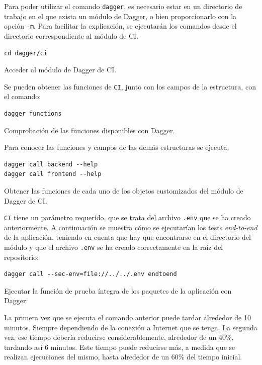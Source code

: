 \begin{enumerate}
    Para poder utilizar el comando \texttt{dagger}, es necesario estar en un directorio de trabajo en el que exista un módulo de Dagger, o bien proporcionarlo con la opción \texttt{-m}. Para facilitar la explicación, se ejecutarán los comandos desde el directorio correspondiente al módulo de CI.

\begin{listing}[!ht]
  \begin{verbatim}
cd dagger/ci
\end{verbatim}
\caption{Acceder al módulo de Dagger de CI.}
\end{listing}

Se pueden obtener las funciones de \texttt{CI}, junto con los campos de la estructura, con el comando:

\begin{listing}[!ht]
  \begin{verbatim}
dagger functions
\end{verbatim}
\caption{Comprobación de las funciones disponibles con Dagger.}
\end{listing}

    Para conocer las funciones y campos de las demás estructuras se ejecuta:

\begin{listing}[!ht]
  \begin{verbatim}
dagger call backend --help
dagger call frontend --help
\end{verbatim}
\caption{Obtener las funciones de cada uno de los objetos customizados del módulo de Dagger de CI.}
\end{listing}

    \texttt{CI} tiene un parámetro requerido, que se trata del archivo \texttt{.env} que se ha creado anteriormente. A continuación se muestra cómo se ejecutarían los tests \textit{end-to-end} de la aplicación, teniendo en cuenta que hay que encontrarse en el directorio del módulo y que el archivo \texttt{.env} se ha creado correctamente en la raíz del repositorio:

\begin{listing}[!ht]
  \begin{verbatim}
dagger call --sec-env=file://../../.env endtoend
\end{verbatim}
\caption{Ejecutar la función de prueba íntegra de los paquetes de la aplicación con Dagger.}
\end{listing}

    La primera vez que se ejecuta el comando anterior puede tardar alrededor de 10 minutos. Siempre dependiendo de la conexión a Internet que se tenga. La segunda vez, ese tiempo debería reducirse considerablemente, alrededor de un 40\%, tardando así 6 minutos. Este tiempo puede reducirse más, a medida que se realizan ejecuciones del mismo, hasta alrededor de un 60\% del tiempo inicial.


\end{enumerate}
